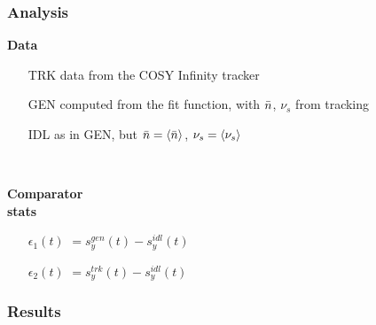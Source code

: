 \documentclass[14pt]{beamer}
\begin{document}
\begin{frame}\frametitle{Analysis}
	\begin{minipage}[t]{.5\linewidth}
		\textbf{Data}
		\begin{itemize}
			\item[TRK] data from the COSY Infinity tracker
			\item[GEN] computed from the fit function, with $\bar n$, $\nu_s$ from tracking
			\item[IDL] as in GEN, but $\nbar = \avg{\nbar}$, $\nu_s = \avg{\nu_s}$ 
		\end{itemize}
	\end{minipage}~~~~
	\begin{minipage}[t]{.5\linewidth}
		\textbf{Comparator\\ stats}
		\begin{itemize}
			\item[$\epsilon_1(t)$] $= s_y^{gen}(t) - s_y^{idl}(t)$
			\item[$\epsilon_2(t)$] $= s_y^{trk}(t) - s_y^{idl}(t)$
		\end{itemize}
	\end{minipage}
\end{frame}
\begin{frame}\frametitle{Results}
\end{frame}
\end{document}
